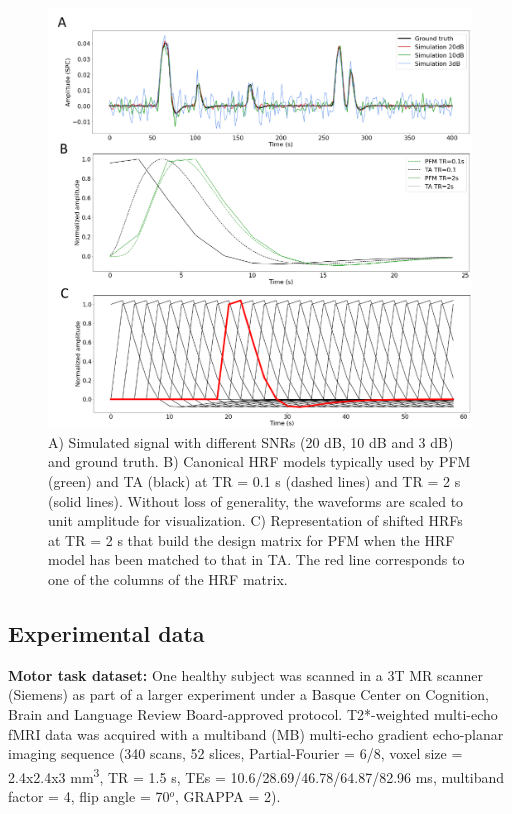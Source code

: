 \begin{figure}[H]
    \begin{center}
        \includegraphics[width=0.75\columnwidth]{figures/sim_and_hrf.pdf}
    \end{center}
    \caption{A) Simulated signal with different SNRs (20 dB, 10 dB and 3 dB) and ground truth. B) Canonical HRF models typically used by PFM (green) and TA (black) at TR = 0.1 s (dashed lines) and TR = 2 s (solid lines). Without loss of generality, the waveforms are scaled to unit amplitude for visualization. C) Representation of shifted HRFs at TR = 2 s that build the design matrix for PFM when the HRF model has been matched to that in TA. The red line corresponds to one of the columns of the HRF matrix.}
\label{fig:sim_and_hrf}
\end{figure}

\subsection{Experimental data}
\textbf{Motor task dataset:} One healthy subject was scanned in a 3T MR scanner (Siemens) as part of a larger experiment under a Basque Center on Cognition, Brain and Language Review Board-approved protocol. T2*-weighted multi-echo fMRI data was acquired with a multiband (MB) multi-echo gradient echo-planar imaging sequence (340 scans, 52 slices, Partial-Fourier = 6/8, voxel size = 2.4x2.4x3 mm\textsuperscript{3}, TR = 1.5 s, TEs = 10.6/28.69/46.78/64.87/82.96 ms, multiband factor = 4, flip angle = 70\(^o\), GRAPPA = 2).

